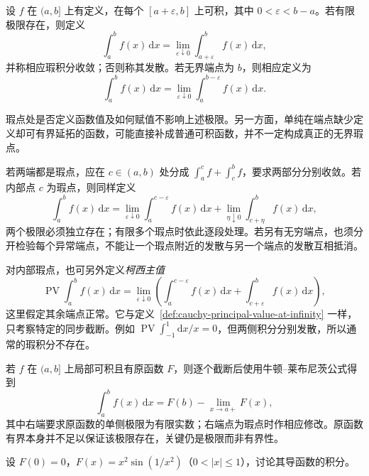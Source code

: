 \begin{definition}[端点处的瑕积分]
\label{def:singular-integrals-at-endpoints}
设 $f$ 在 $(a,b]$ 上有定义，在每个 $[a+\varepsilon,b]$ 上可积，其中 $0<\varepsilon<b-a$。若有限极限存在，则定义
\begin{equation}
    \int_a^b f(x)\,\mathrm{d}x
    =\lim_{\varepsilon\downarrow0}
        \int_{a+\varepsilon}^b f(x)\,\mathrm{d}x,
    \label{eq:singular-integral-left-endpoint}
\end{equation}
并称相应瑕积分收敛；否则称其发散。若无界端点为 $b$，则相应定义为
\begin{equation}
    \int_a^b f(x)\,\mathrm{d}x
    =\lim_{\varepsilon\downarrow0}
        \int_a^{b-\varepsilon} f(x)\,\mathrm{d}x.
    \label{eq:singular-integral-right-endpoint}
\end{equation}
\end{definition}

瑕点处是否定义函数值及如何赋值不影响上述极限。另一方面，单纯在端点缺少定义却可有界延拓的函数，可能直接补成普通可积函数，并不一定构成真正的无界瑕点。

若两端都是瑕点，应在 $c\in(a,b)$ 处分成 $\int_a^c f+\int_c^b f$，要求两部分分别收敛。若内部点 $c$ 为瑕点，则同样定义
\[
    \int_a^b f(x)\,\mathrm{d}x
    =\lim_{\varepsilon\downarrow0}\int_a^{c-\varepsilon}f(x)\,\mathrm{d}x
     +\lim_{\eta\downarrow0}\int_{c+\eta}^b f(x)\,\mathrm{d}x,
\]
两个极限必须独立存在；有限多个瑕点时依此逐段处理。若另有无穷端点，也须分开检验每个异常端点，不能让一个瑕点附近的发散与另一个端点的发散互相抵消。

对内部瑕点，也可另外定义\emph{柯西主值}
\[
    \operatorname{PV}\int_a^b f(x)\,\mathrm{d}x
    =\lim_{\varepsilon\downarrow0}
       \left(\int_a^{c-\varepsilon}f(x)\,\mathrm{d}x
             +\int_{c+\varepsilon}^b f(x)\,\mathrm{d}x\right),
\]
这里假定其余端点正常。它与定义~\ref{def:cauchy-principal-value-at-infinity} 一样，只考察特定的同步截断。例如 $\operatorname{PV}\int_{-1}^1\mathrm{d}x/x=0$，但两侧积分分别发散，所以通常的瑕积分不存在。

若 $f$ 在 $(a,b]$ 上局部可积且有原函数 $F$，则逐个截断后使用牛顿--莱布尼茨公式得到
\begin{equation}
    \int_a^b f(x)\,\mathrm{d}x
    =F(b)-\lim_{x\to a+}F(x),
    \label{eq:singular-newton-leibniz}
\end{equation}
其中右端要求原函数的单侧极限为有限实数；右端点为瑕点时作相应修改。原函数有界本身并不足以保证该极限存在，关键仍是极限而非有界性。

\begin{example}
\label{ex:unbounded-derivative-singular-integral}
设 $F(0)=0$，$F(x)=x^2\sin(1/x^2)$（$0<|x|\leq1$），讨论其导函数的积分。
\end{example}

